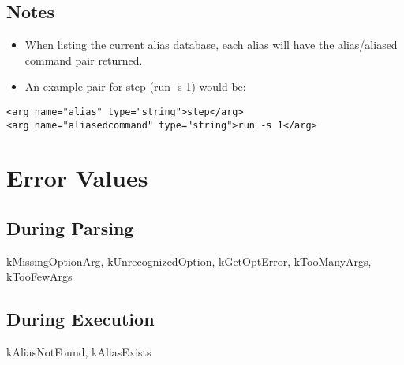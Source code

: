 \documentclass[10pt]{article}
\begin{document}
\subsection*{ Notes }
\begin{itemize}
\item  When listing the current alias database, each alias will have the alias/aliased command pair returned. 
\item  An example pair for step (run -s 1) would be: 

\end{itemize}
\begin{verbatim}
<arg name="alias" type="string">step</arg>
<arg name="aliasedcommand" type="string">run -s 1</arg>

\end{verbatim}
\section*{ Error Values }
\subsection*{ During Parsing }


 kMissingOptionArg, kUnrecognizedOption, kGetOptError, kTooManyArgs, kTooFewArgs
\subsection*{ During Execution }


 kAliasNotFound, kAliasExists
\end{document}
